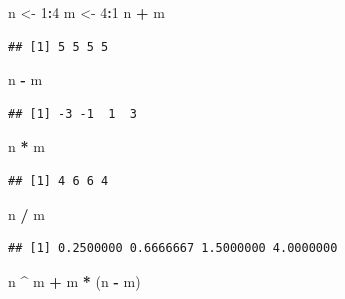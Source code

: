 \documentclass[]{book}
\newenvironment{Shaded}{\begin{snugshade}}{\end{snugshade}}
\newcommand{\DecValTok}[1]{\textcolor[rgb]{0.00,0.00,0.81}{#1}}
\newcommand{\StringTok}[1]{\textcolor[rgb]{0.31,0.60,0.02}{#1}}
\newcommand{\OperatorTok}[1]{\textcolor[rgb]{0.81,0.36,0.00}{\textbf{#1}}}
\newcommand{\NormalTok}[1]{#1}
\begin{document}
\begin{Shaded}
\begin{Highlighting}[]
\NormalTok{n <-}\StringTok{ }\DecValTok{1}\OperatorTok{:}\DecValTok{4}
\NormalTok{m <-}\StringTok{ }\DecValTok{4}\OperatorTok{:}\DecValTok{1}
\NormalTok{n }\OperatorTok{+}\StringTok{ }\NormalTok{m}
\end{Highlighting}
\end{Shaded}

\begin{verbatim}
## [1] 5 5 5 5
\end{verbatim}

\begin{Shaded}
\begin{Highlighting}[]
\NormalTok{n }\OperatorTok{-}\StringTok{ }\NormalTok{m}
\end{Highlighting}
\end{Shaded}

\begin{verbatim}
## [1] -3 -1  1  3
\end{verbatim}

\begin{Shaded}
\begin{Highlighting}[]
\NormalTok{n }\OperatorTok{*}\StringTok{ }\NormalTok{m}
\end{Highlighting}
\end{Shaded}

\begin{verbatim}
## [1] 4 6 6 4
\end{verbatim}

\begin{Shaded}
\begin{Highlighting}[]
\NormalTok{n }\OperatorTok{/}\StringTok{ }\NormalTok{m}
\end{Highlighting}
\end{Shaded}

\begin{verbatim}
## [1] 0.2500000 0.6666667 1.5000000 4.0000000
\end{verbatim}

\begin{Shaded}
\begin{Highlighting}[]
\NormalTok{n }\OperatorTok{^}\StringTok{ }\NormalTok{m }\OperatorTok{+}\StringTok{ }\NormalTok{m }\OperatorTok{*}\StringTok{ }\NormalTok{(n }\OperatorTok{-}\StringTok{ }\NormalTok{m)}
\end{Highlighting}
\end{Shaded}
\end{document}
